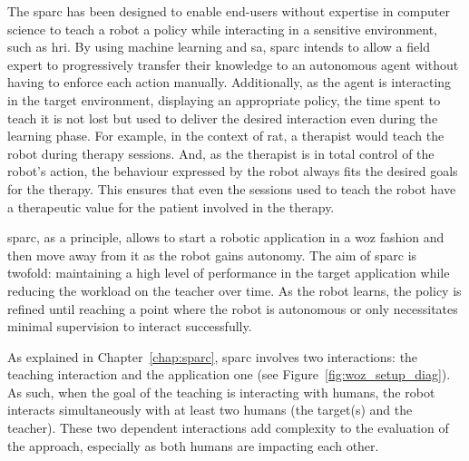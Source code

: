 The \gls{sparc} has been designed to enable end-users without expertise in computer science to teach a robot a policy while interacting in a sensitive environment, such as \gls{hri}. By using machine learning and \gls{sa}, \gls{sparc} intends to allow a field expert to progressively transfer their knowledge to an autonomous agent without having to enforce each action manually. Additionally, as the agent is interacting in the target environment, displaying an appropriate policy, the time spent to teach it is not lost but used to deliver the desired interaction even during the learning phase. For example, in the context of \gls{rat}, a therapist would teach the robot during therapy sessions. And, as the therapist is in total control of the robot's action, the behaviour expressed by the robot always fits the  desired goals for the therapy. This ensures that even the sessions used to teach the robot have a therapeutic value for the patient involved in the therapy.

\gls{sparc}, as a principle, allows to start a robotic application in a \gls{woz} fashion and then move away from it as the robot gains autonomy. The aim of \gls{sparc} is twofold: maintaining a high level of performance in the target application while reducing the workload on the teacher over time. As the robot learns, the policy is refined until reaching a point where the robot is autonomous or only necessitates minimal supervision to interact successfully. 

As explained in Chapter~\ref{chap:sparc}, \gls{sparc} involves two interactions: the teaching interaction and the application one (see Figure~\ref{fig:woz_setup_diag}). As such, when the goal of the teaching is interacting with humans, the robot interacts simultaneously with at least two humans (the target(s) and the teacher). These two dependent interactions add complexity to the evaluation of the approach, especially as both humans are impacting each other. 

